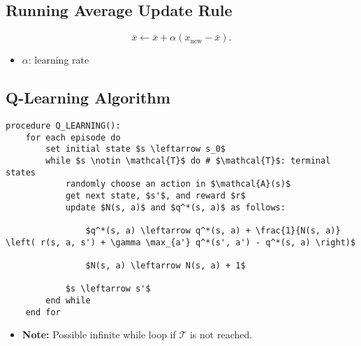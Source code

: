 \subsection{Running Average Update Rule}
\begin{definition}
    \begin{equation*}
        \bar{x} \gets \bar{x} + \alpha (x_{\text{new}} - \bar{x}).
    \end{equation*}
    \begin{itemize}
        \item $\alpha$: learning rate
    \end{itemize}
\end{definition}
\newpage

\subsection{Q-Learning Algorithm}
\begin{algo}
\begin{lstlisting}
procedure Q_LEARNING():
    for each episode do
        set initial state $s \leftarrow s_0$
        while $s \notin \mathcal{T}$ do # $\mathcal{T}$: terminal states
            randomly choose an action in $\mathcal{A}(s)$
            get next state, $s'$, and reward $r$
            update $N(s, a)$ and $q^*(s, a)$ as follows:

                $q^*(s, a) \leftarrow q^*(s, a) + \frac{1}{N(s, a)} \left( r(s, a, s') + \gamma \max_{a'} q^*(s', a') - q^*(s, a) \right)$
            
                $N(s, a) \leftarrow N(s, a) + 1$
            
            $s \leftarrow s'$
        end while
    end for
\end{lstlisting}
\begin{itemize}
    \item \textbf{Note:} Possible infinite while loop if $\mathcal{T}$ is not reached.
\end{itemize}
\end{algo}

